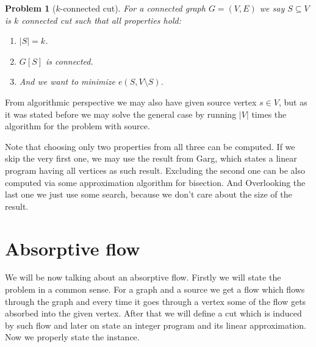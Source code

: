 \documentclass{article}
\theoremstyle{plain}
\theoremstyle{plain}
\newtheorem{problem}{Problem}
\theoremstyle{remark}
\begin{document}
	\begin{problem}[$k$-connected cut]
		For a connected graph $G = (V,E)$ we say $S \subseteq V$ is $k$ connected cut such that all properties hold:
		
		\begin{enumerate}
			\item $|S| = k$.
			\item $G[S]$ is connected.
			\item And we want to minimize $e(S, V \setminus S)$.
		\end{enumerate}
	\end{problem}

	From algorithmic perspective we may also have given source vertex $s \in V$, but as it was stated before we may solve the general case by running $|V|$ times the algorithm for the problem with source.
	
	Note that choosing only two properties from all three can be computed. If we skip the very first one, we may use the result from Garg, which states a linear program having all vertices as such result. Excluding the second one can be also computed via some approximation algorithm for bisection. And Overlooking the last one we just use some search, because we don't care about the size of the result.
	
	\section{Absorptive flow}
	
	We will be now talking about an absorptive flow. Firstly we will state the problem in a common sense. For a graph and a source we get a flow which flows through the graph and every time it goes through a vertex some of the flow gets absorbed into the given vertex. After that we will define a cut which is induced by such flow and later on state an integer program and its linear approximation. Now we properly state the instance.
	
\end{document}
